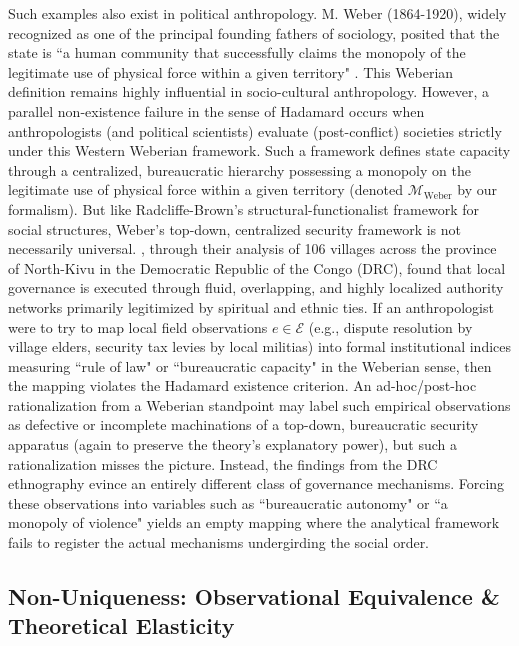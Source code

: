 \documentclass{article}
\theoremstyle{definition}
\begin{document}
Such examples also exist in political anthropology. M. Weber (1864-1920), widely recognized as one of the principal founding fathers of sociology, posited that the state is ``a human community that successfully claims the monopoly of the legitimate use of physical force within a given territory" \cite{Mit11}. This Weberian definition remains highly influential in socio-cultural anthropology. However, a parallel non-existence failure in the sense of Hadamard occurs when anthropologists (and political scientists) evaluate (post-conflict) societies strictly under this Western Weberian framework. Such a framework defines state capacity through a centralized, bureaucratic hierarchy possessing a monopoly on the legitimate use of physical force within a given territory (denoted $\mathcal{M}_{\text{Weber}}$ by our formalism). But like Radcliffe-Brown's structural-functionalist framework for social structures, Weber's top-down, centralized security framework is not necessarily universal. \cite{Hen+24}, through their analysis of 106 villages across the province of North-Kivu in the Democratic Republic of the Congo (DRC), found that local governance is executed through fluid, overlapping, and highly localized authority networks primarily legitimized by spiritual and ethnic ties. If an anthropologist were to try to map local field observations $e \in \mathcal{E}$ (e.g., dispute resolution by village elders, security tax levies by local militias) into formal institutional indices measuring ``rule of law" or ``bureaucratic capacity" in the Weberian sense, then the mapping violates the Hadamard existence criterion. An ad-hoc/post-hoc rationalization from a Weberian standpoint may label such empirical observations as defective or incomplete machinations of a top-down, bureaucratic security apparatus (again to preserve the theory's explanatory power), but such a rationalization misses the picture. Instead, the findings from the DRC ethnography evince an entirely different class of governance mechanisms. Forcing these observations into variables such as ``bureaucratic autonomy" or ``a monopoly of violence" yields an empty mapping where the analytical framework fails to register the actual mechanisms undergirding the social order.

\subsection{Non-Uniqueness: Observational Equivalence \& Theoretical Elasticity}
\end{document}
